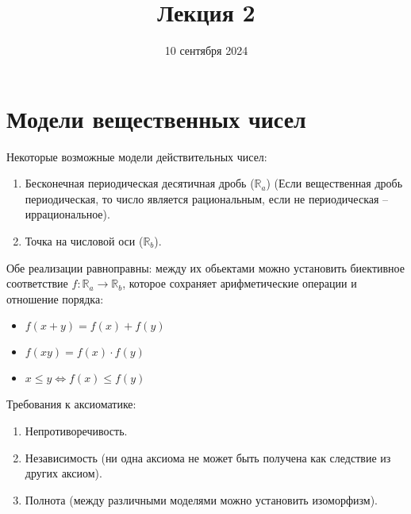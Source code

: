 \documentclass{article}
\title{Лекция 2}
\author{}
\date{10 сентября 2024}
\begin{document}
    \maketitle
    \noindent
    \section{Модели вещественных чисел}
    Некоторые возможные модели действительных чисел:
    \begin{enumerate}
        \item Бесконечная периодическая десятичная дробь (\(\mathbb{R}_{a}\)) (Если вещественная дробь периодическая, то число является рациональным, если не периодическая -- иррациональное).
        \item Точка на числовой оси (\(\mathbb{R}_{b}\)).
    \end{enumerate}
    Обе реализации равноправны: между их обьектами можно установить биективное соответствие \(f: \mathbb{R}_{a} \to \mathbb{R}_{b}\),
    которое сохраняет арифметические операции и отношение порядка:
    \begin{itemize}
        \item \(f(x + y) = f(x) + f(y)\)
        \item \(f(xy) = f(x) \cdot f(y)\)
        \item \(x \leq y \Leftrightarrow f(x) \leq  f(y)\)
    \end{itemize}  
    Требования к аксиоматике:
    \begin{enumerate}
        \item Непротиворечивость.
        \item Независимость (ни одна аксиома не может быть получена как следствие из других аксиом).
        \item Полнота (между различными моделями можно установить изоморфизм).
    \end{enumerate}
\end{document}

